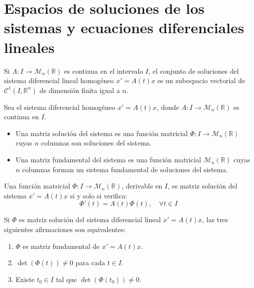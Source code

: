 \chapter{Espacios de soluciones de los sistemas y ecuaciones diferenciales lineales}
\begin{theorem}
    Si $A: I \to \mathcal{M}_n(\mathbb{R})$ es continua en el intervalo $I$, el conjunto de soluciones del sistema diferencial lineal homogéneo $x' = A(t)x$ es un subespacio vectorial de $\mathcal{C}^1(I, \mathbb{R}^n)$ de dimensión finita igual a $n$.
\end{theorem}

\begin{definition}
    Sea el sistema diferencial homogéneo $x' = A(t)x$, donde $A: I \to \mathcal{M}_n(\mathbb{R})$ es continua en $I$.
    \begin{itemize}
        \item Una matriz solución del sistema es una función matricial $\Phi: I \to \mathcal{M}_n(\mathbb{R})$ cuyas $n$ columnas son soluciones del sistema.
        \item Una matriz fundamental del sistema es una función matricial $\mathcal{M}_n(\mathbb{R})$ cuyas $n$ columnas forman un sistema fundamental de soluciones del sistema.
    \end{itemize}
\end{definition}

\begin{theorem}
    Una función matricial $\Phi: I \to \mathcal{M}_n(\mathbb{R})$, derivable en $I$, es matriz solución del sistema $x' = A(t)x$ si y solo si verifica:
    $$\Phi'(t) = A(t)\Phi(t), \quad \forall t \in I$$
\end{theorem}

\begin{theorem}
    Si $\Phi$ es matriz solución del sistema diferencial lineal $x' = A(t)x$, las tres siguientes afirmaciones son equivalentes:
    \begin{enumerate}
        \item $\Phi$ es matriz fundamental de $x' = A(t)x$.
        \item $\det(\Phi(t)) \neq 0$ para cada $t \in I$.
        \item Existe $t_0 \in I$ tal que $\det(\Phi(t_0)) \neq 0$.
    \end{enumerate}
\end{theorem}

